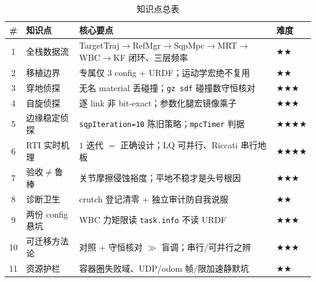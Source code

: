 \begin{table}[H]\centering\small
\caption{知识点总表}
\begin{tabular}{clll}
\toprule
\# & 知识点 & 核心要点 & 难度 \\
\midrule
1 & 全栈数据流 & TargetTraj$\to$RefMgr$\to$SqpMpc$\to$MRT$\to$WBC$\to$KF 闭环、三层频率 & \(\bigstar\bigstar\) \\
2 & 移植边界 & 专属仅 $3$ config + URDF；运动学宏绝不复用 & \(\bigstar\bigstar\) \\
3 & 穿地侦探 & 无名 material 丢碰撞；\texttt{gz sdf} 碰撞数守恒核对 & \(\bigstar\bigstar\bigstar\) \\
4 & 自旋侦探 & 逐 link 非 bit-exact；参数化腿宏镜像乘子 & \(\bigstar\bigstar\bigstar\) \\
5 & 边缘稳定侦探 & \texttt{sqpIteration=10} 陈旧策略；\texttt{mpcTimer} 判据 & \(\bigstar\bigstar\bigstar\bigstar\) \\
6 & RTI 实时机理 & $1$ 迭代 $=$ 正确设计；LQ 可并行、Riccati 串行地板 & \(\bigstar\bigstar\bigstar\bigstar\) \\
7 & 验收$\neq$鲁棒 & 关节摩擦侵蚀裕度；平地不稳才是头号根因 & \(\bigstar\bigstar\bigstar\) \\
8 & 诊断卫生 & crutch 登记清零 + 独立审计防自我说服 & \(\bigstar\bigstar\) \\
9 & 两份 config 悬坑 & WBC 力矩限读 \texttt{task.info} 不读 URDF & \(\bigstar\bigstar\bigstar\) \\
10 & 可迁移方法论 & 对照 + 守恒核对 $\gg$ 盲调；串行/可并行之辨 & \(\bigstar\bigstar\bigstar\) \\
11 & 资源护栏 & 容器圈失败域、UDP/odom 帧/限加速静默坑 & \(\bigstar\bigstar\) \\
\bottomrule
\end{tabular}
\end{table}

